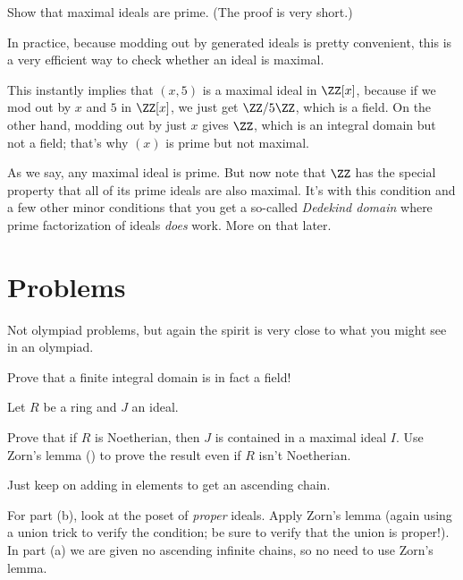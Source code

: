 \begin{ques}
	Show that maximal ideals are prime.
	(The proof is very short.)
\end{ques}

In practice, because modding out by generated ideals is pretty convenient,
this is a very efficient way to check whether an ideal is maximal.
\begin{example}
	\listhack
	\begin{enumerate}[(a)]
		\ii This instantly implies that $(x,5)$ is a maximal ideal
		in $\ZZ[x]$, because if we mod out by $x$ and $5$ in $\ZZ[x]$,
		we just get $\ZZ/5\ZZ$, which is a field.
		\ii On the other hand, modding out by just $x$ gives $\ZZ$,
		which is an integral domain but not a field; that's why $(x)$ is
		prime but not maximal.
	\end{enumerate}
\end{example}

As we say, any maximal ideal is prime.
But now note that $\ZZ$ has the special property that
all of its prime ideals are also maximal.
It's with this condition and a few other minor conditions
that you get a so-called \emph{Dedekind domain}
where prime factorization of ideals \emph{does} work.
More on that later.

\section{Problems}
Not olympiad problems, but again the spirit is very close
to what you might see in an olympiad.

\begin{sproblem}
	Prove that a finite integral domain is in fact a field!
	\label{prob:finite_domain_field}
\end{sproblem}

\begin{sproblem}
	Let $R$ be a ring and $J$ an ideal.
	\begin{enumerate}[(a)]
		\ii Prove that if $R$ is Noetherian,
		then $J$ is contained in a maximal ideal $I$.
		\ii Use Zorn's lemma ()
		to prove the result even if $R$ isn't Noetherian.
	\end{enumerate}
	\begin{hint}
		Just keep on adding in elements to get an ascending chain.
	\end{hint}
	\begin{sol}
		For part (b), look at the poset of \emph{proper} ideals.
		Apply Zorn's lemma (again using a union trick to verify the condition;
		be sure to verify that the union is proper!).
		In part (a) we are given no ascending infinite chains,
		so no need to use Zorn's lemma.
	\end{sol}
\end{sproblem}

